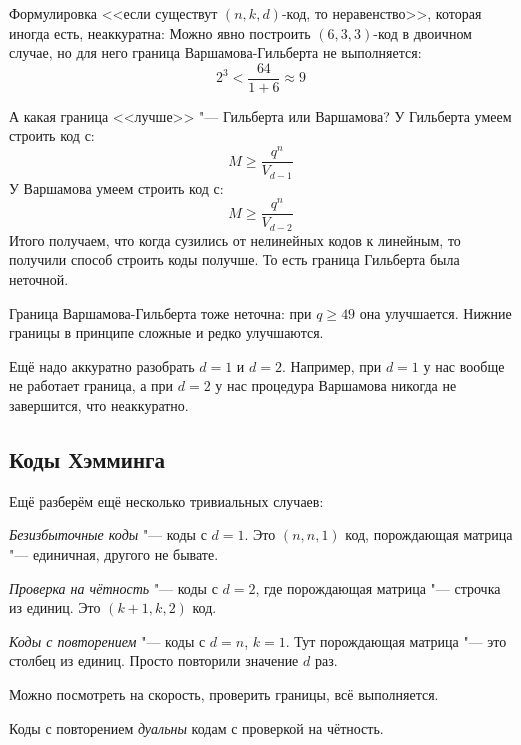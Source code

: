 \begin{Rem}
	Формулировка <<если существут $(n, k, d)$-код, то неравенство>>, которая иногда есть, неаккуратна:
	Можно явно построить $(6, 3, 3)$-код в двоичном случае, но для него граница Варшамова-Гильберта не выполняется:
	\[
	2^3 < \frac{64}{1 + 6} \approx 9
	\]
\end{Rem}
\begin{Rem}
	А какая граница <<лучше>> "--- Гильберта или Варшамова?
	У Гильберта умеем строить код с:
	\[
	M \ge \frac{q^n}{V_{d-1}}
	\]
	У Варшамова умеем строить код с:
	\[
	M \ge \frac{q^n}{V_{d-2}}
	\]
	Итого получаем, что когда сузились от нелинейных кодов к линейным, то получили
	способ строить коды получше.
	То есть граница Гильберта была неточной.
\end{Rem}
\begin{Rem}
	Граница Варшамова-Гильберта тоже неточна: при $q \ge 49$ она улучшается.
	Нижние границы в принципе сложные и редко улучшаются.
\end{Rem}
\begin{Rem}
	Ещё надо аккуратно разобрать $d=1$ и $d=2$.
	Например, при $d=1$ у нас вообще не работает граница,
	а при $d=2$ у нас процедура Варшамова никогда не завершится, что неаккуратно.
\end{Rem}

\subsection{Коды Хэмминга}
Ещё разберём ещё несколько тривиальных случаев:
\begin{Def}
	\textit{Безизбыточные коды} "--- коды с $d=1$.
	Это $(n, n, 1)$ код, порождающая матрица "--- единичная, другого не бывате.
\end{Def}
\begin{Def}
	\textit{Проверка на чётность} "--- коды с $d=2$,
	где порождающая матрица "--- строчка из единиц.
	Это $(k+1, k, 2)$ код.
\end{Def}
\begin{Def}
	\textit{Коды с повторением} "--- коды с $d=n$, $k=1$.
	Тут порождающая матрица "--- это столбец из единиц.
	Просто повторили значение $d$ раз.
\end{Def}
\begin{Rem}
	Можно посмотреть на скорость, проверить границы, всё выполняется.
\end{Rem}
\begin{Rem}
	Коды с повторением \textit{дуальны} кодам с проверкой на чётность.
\end{Rem}

